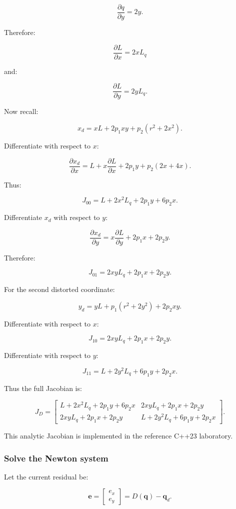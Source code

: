 \[
 \frac{\partial q}{\partial y}=2y.
\]

Therefore:

\[
 \boxed{ \frac{\partial L}{\partial x}=2xL_q }
\]

and:

\[
 \boxed{ \frac{\partial L}{\partial y}=2yL_q }.
\]

Now recall:

\[
 x_d=xL+2p_1xy+p_2(r^2+2x^2).
\]

Differentiate with respect to \(x\):

\[
 \frac{\partial x_d}{\partial x} = L+x\frac{\partial L}{\partial x} +2p_1y +p_2(2x+4x).
\]

Thus:

\[
 \boxed{ J_{00}= L+2x^2L_q+2p_1y+6p_2x }.
\]

Differentiate \(x_d\) with respect to \(y\):

\[
 \frac{\partial x_d}{\partial y} = x\frac{\partial L}{\partial y} +2p_1x +2p_2y.
\]

Therefore:

\[
 \boxed{ J_{01}= 2xyL_q+2p_1x+2p_2y }.
\]

For the second distorted coordinate:

\[
 y_d=yL+p_1(r^2+2y^2)+2p_2xy.
\]

Differentiate with respect to \(x\):

\[
 \boxed{ J_{10}= 2xyL_q+2p_1x+2p_2y }.
\]

Differentiate with respect to \(y\):

\[
 \boxed{ J_{11}= L+2y^2L_q+6p_1y+2p_2x }.
\]

Thus the full Jacobian is:

\[
 \boxed{ J_D= \begin{bmatrix} L+2x^2L_q+2p_1y+6p_2x& 2xyL_q+2p_1x+2p_2y\\ 2xyL_q+2p_1x+2p_2y& L+2y^2L_q+6p_1y+2p_2x \end{bmatrix} }.
\]

This analytic Jacobian is implemented in the reference C++23 laboratory.

\subsubsection{Solve the Newton system}\label{solve-the-newton-system}

Let the current residual be:

\[
 \mathbf e= \begin{bmatrix} e_x\\e_y \end{bmatrix} = D(\mathbf q)-\mathbf q_d.
\]

